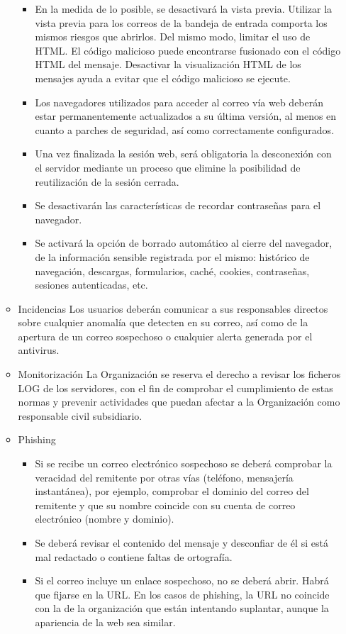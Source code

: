 \begin{enumerate}[label=\alph*)]
\begin{itemize}
\begin{itemize}
        \item En la medida de lo posible, se desactivará la vista previa. Utilizar la vista previa para los correos de la bandeja de entrada comporta los mismos riesgos que abrirlos. Del mismo modo, limitar el uso de HTML. El código malicioso puede encontrarse fusionado con el código HTML del mensaje. Desactivar la visualización HTML de los mensajes ayuda a evitar que el código malicioso se ejecute.
        \item Los navegadores utilizados para acceder al correo vía web deberán estar permanentemente actualizados a su última versión, al menos en cuanto a parches de seguridad, así como correctamente configurados.
        \item Una vez finalizada la sesión web, será obligatoria la desconexión con el servidor mediante un proceso que elimine la posibilidad de reutilización de la sesión cerrada.
        \item Se desactivarán las características de recordar contraseñas para el navegador.
        \item Se activará la opción de borrado automático al cierre del navegador, de la información sensible registrada por el mismo: histórico de navegación, descargas, formularios, caché, cookies, contraseñas, sesiones autenticadas, etc.
    \end{itemize}
    \item Incidencias
    Los usuarios deberán comunicar a sus responsables directos sobre cualquier anomalía que detecten en su correo, así como de la apertura de un correo sospechoso o cualquier alerta generada por el antivirus.
    \item Monitorización
    La Organización se reserva el derecho a revisar los ficheros LOG de los servidores, con el fin de comprobar el cumplimiento de estas normas y prevenir actividades que puedan afectar a la Organización como responsable civil subsidiario.
    \item Phishing
    \begin{itemize}
        \item Si se recibe un correo electrónico sospechoso se deberá comprobar la veracidad del remitente por otras vías (teléfono, mensajería instantánea), por ejemplo, comprobar el dominio del correo del remitente y que su nombre coincide con su cuenta de correo electrónico (nombre y dominio).
        \item Se deberá revisar el contenido del mensaje y desconfiar de él si está mal redactado o contiene faltas de ortografía.
        \item Si el correo incluye un enlace sospechoso, no se deberá abrir. Habrá que fijarse en la URL. En los casos de phishing, la URL no coincide con la de la organización que están intentando suplantar, aunque la apariencia de la web sea similar.

\end{itemize}
\end{itemize}
\end{enumerate}
